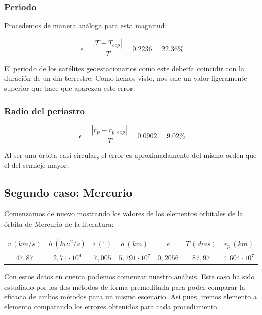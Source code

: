\documentclass{article}
\numberwithin{equation}{section}
\begin{document}
\subsubsection{Periodo}
Procedemos de manera análoga para esta magnitud:

\begin{equation*}
    \epsilon=\frac{\left\lvert T-T_{exp} \right\rvert}{T}=0.2236=22.36\%
\end{equation*}

El periodo de los satélites geoestacionarios como este debería coincidir con la duración de un día terrestre. Como hemos visto, nos sale un valor ligeramente superior que hace que aparezca este error.

\subsubsection{Radio del periastro}

\begin{equation*}
    \epsilon=\frac{\left\lvert r_p-r_{p,\,exp} \right\rvert}{T}=0.0902=9.02\%
\end{equation*}

Al ser una órbita casi circular, el error es aproximadamente del mismo orden que el del semieje mayor.

\subsection{Segundo caso: Mercurio}
Comenzamos de nuevo mostrando los valores de los elementos orbitales 
de la órbita de Mercurio de la literatura: 

\begin{center}
    \centering
    \begin{tabular}{|c|c|c|c|c|c|c|}
    \hline
    $\overline{v}\, (km/s)$ & $h\, (km^{2}/s)$ & $i\, (^{\circ})$ & $a\, (km)$ & $e$ & $T\, (dias)$ & $r_{p}\, (km)$\\ \hline
    $47,87$ & $2,71 \cdot 10^{9}$ & $7,005$ & $5,791\cdot 10^{7}$ & $0,2056$ & $87,97$ & $4.604\cdot10^7$\\ \hline
    \end{tabular}
\end{center}

Con estos datos en cuenta podemos comenzar nuestro análisis. Este caso ha sido estudiado por los dos métodos de forma premeditada para poder comparar la eficacia de ambos métodos para un mismo escenario. Así pues, iremos elemento a elemento comparando los errores obtenidos para cada procedimiento.
\end{document}
